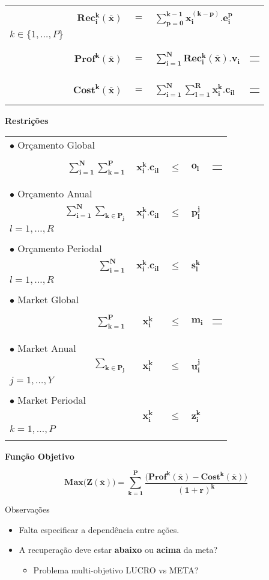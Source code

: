 \documentclass{article}
\newcommand{\topico}[1]{
  \vspace{20pt}
  {\Large \bf #1 }
}
\newenvironment{restricoes}
  { \begin{longtable}{lrccll}}
  {\end{longtable} }
\newcommand{\restricao}[6]{
    \multicolumn{2}{l}{ $\bullet$ #1} & & \\ \nopagebreak
    & ${ \displaystyle \bm{#2} }$
    & ${ \bm{#3} }$
    & ${ \bm{#4} }$
    & ${ \bm{#5} }$ &
    \begin{tabular}{l}
	  #6
    \end{tabular}
	\\ \hspace{30pt}
}
\newenvironment{equacoes}
	{ \begin{longtable}{lrcll} }
	{ \end{longtable} }
\newcommand{\equacao}[4]{
    \multicolumn{5}{l}{\text{ \parbox{250pt}{$\bullet$ #1} }} \\   %
    \phantom{aaaaaa} & $ \displaystyle \bm{#2} $                              %
    & $ = $                 
	& $\displaystyle \bm{#3} $                           %
	&
	\begin{tabular}{l}
	  #4                                 %
	\end{tabular}
	\vspace{12pt}
	\\
}
\begin{document}
\begin{equacoes}
    \equacao
	  {Recuperação de energia para o período $k$ causada pelas as ações $i$ de todos os períodos.}
	  {Rec_{i}^{k}(\overline{x})}
	  {\sum_{p = 0}^{k-1} x_i^{(k-p)} . e_i^{p}}
	  { $i \in \{1, \ldots, N\}$ \\ $k \in \{1, \ldots, P\}$ }
	\equacao
	  {Lucro originado pela energia recuperada no período $k$.}
	  {Prof^k(\overline{x})}
	  {\sum_{i=1}^N Rec_{i}^k(\overline{x}) . v_i}
	  { $k \in \{1, \ldots, P\}$}
	\equacao
	  {Custo total de todas as ações executadas no período $k$.}
	  {Cost^k(\overline{x})}
	  {\sum_{i=1}^N \sum_{l=1}^R x_i^k . c_{il}}
	  { $k \in \{1, \ldots, P\}$}
\end{equacoes}

\topico{Restrições}

\begin{restricoes}
    \restricao
	  {Orçamento Global}
	  { \sum_{i = 1}^N \sum_{k = 1}^P }
	  { x_i^k . c_{il}}
	  { \leq }
	  { o_l }
	  { $ l = 1, \ldots, R $ }
	\\
    \restricao
      {Orçamento Anual}
      { \sum_{i = 1}^N \sum_{k \in P_j} }
      { x_i^k . c_{il} }
	  { \leq }
	  { p_l^j }
	  { $ j = 1, \ldots, Y $ \\ $ l = 1, \ldots, R$ }
    \\
	\restricao
	  {Orçamento Periodal}
      { \sum_{i = 1}^N }
      { x_i^k . c_{il} }
	  { \leq }
	  { s_l^{k} }
	  { $ k = 1, \ldots, P $ \\ $ l = 1, \ldots, R $ }
	\\
	\restricao
	  {Market Global}
      { \sum_{k = 1}^P }
      { x_i^k }
	  { \leq }
	  { m_i }
	  { $ i = 1, \ldots, N $ }
	\\
	\restricao
	  {Market Anual}
      { \sum_{k \in P_j} }
      { x_i^k }
	  { \leq }
	  { u_i^j }
	  { $ i = 1, \ldots, N $ \\ $ j = 1, \ldots, Y $ }
	\\
	\restricao
	  {Market Periodal}
      { }
      { x_i^k }
	  { \leq }
	  { z_i^k }
	  { $ i = 1, \ldots, N $ \\ $ k = 1, \ldots, P$ }
\end{restricoes}

\pagebreak

\topico{Função Objetivo}
\begin{equation}
  \nonumber
    \bm{
	  Max \big(Z(\overline{x})\big) =
	    \sum_{k=1}^P
	    \frac
		  {\big( Prof^k(\overline{x}) - Cost^k(\overline{x}) \big)}
	      {(1+r)^k}
	}
  \label{eq:budget}
\end{equation}

\vfill

Observações

\begin{itemize}
  \item Falta especificar a dependência entre ações.
  \item A recuperação deve estar {\bf abaixo} ou {\bf acima} da meta?
  \begin{itemize}
    \item Problema multi-objetivo LUCRO vs META?
  \end{itemize}
\end{itemize}
\end{document}
